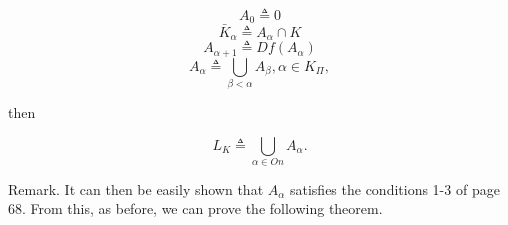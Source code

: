 $$A_0 \triangleq 0$$
$$\bar{K}_{\alpha} \triangleq A_{\alpha} \cap K$$
$$A_{\alpha+1} \triangleq Df(A_{\alpha})$$
$$A_{\alpha} \triangleq \bigcup_{\beta < \alpha} A_{\beta}, \alpha \in K_{\Pi},$$

then

$$L_K \triangleq \bigcup_{\alpha \in On} A_{\alpha}.$$

Remark. It can then be easily shown that $A_{\alpha}$ satisfies the conditions 1-3 of page 68. From this, as before, we can prove the following theorem.

